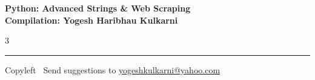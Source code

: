 \documentclass[8pt,landscape]{article}
\begin{document}
\footnotesize


\begin{center}
\Large{\textbf{Python: Advanced Strings \& Web Scraping\\ Compilation: Yogesh Haribhau Kulkarni}}
\end{center}

\begin{multicols}{3}

\end{multicols}

\rule{\linewidth}{0.25pt}
\scriptsize
Copyleft \textcopyleft\  Send suggestions to
\href{http://www.yogeshkulkarni.com}{yogeshkulkarni@yahoo.com}
\end{document}
